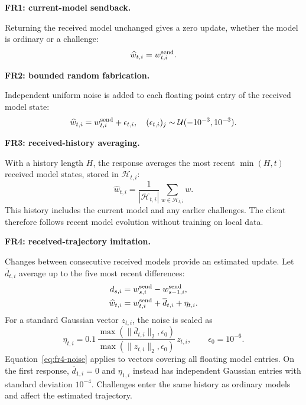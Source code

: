 \documentclass[journal]{IEEEtran}
\begin{document}
\par\medskip\noindent\textbf{FR1: current-model sendback.}\par\nopagebreak\smallskip\noindent
Returning the received model unchanged gives a zero update, whether the
model is ordinary or a challenge:
\begin{equation}
 \widehat w_{t,i}=w^{\rm send}_{t,i}.
\end{equation}

\par\medskip\noindent\textbf{FR2: bounded random fabrication.}\par\nopagebreak\smallskip\noindent
Independent uniform noise is added to each floating point entry of the
received model state:
\begin{equation}
 \widehat w_{t,i}=w^{\rm send}_{t,i}+\epsilon_{t,i},\quad
 (\epsilon_{t,i})_j\sim\mathcal U(-10^{-3},10^{-3}).
\end{equation}

\par\medskip\noindent\textbf{FR3: received-history averaging.}\par\nopagebreak\smallskip\noindent
With a history length $H$, the response averages the most recent
$\min(H,t)$ received model states, stored in $\mathcal H_{t,i}$:
\begin{equation}
 \widehat w_{t,i}=\frac{1}{|\mathcal H_{t,i}|}
       \sum_{w\in\mathcal H_{t,i}}w.
\end{equation}
This history includes the current model and any earlier challenges. The client
therefore follows recent model evolution without training on local data.

\par\medskip\noindent\textbf{FR4: received-trajectory imitation.}\par\nopagebreak\smallskip\noindent
Changes between consecutive received models provide an estimated update.
Let $\overline d_{t,i}$ average up to the five most recent differences:
\begin{align}
 d_{s,i}&=w^{\rm send}_{s,i}-w^{\rm send}_{s-1,i},\\
 \widehat w_{t,i}&=w^{\rm send}_{t,i}+\overline d_{t,i}+\eta_{t,i}.
\end{align}
For a standard Gaussian vector $z_{t,i}$, the noise is scaled as
\begin{equation}\label{eq:fr4-noise}
 \eta_{t,i}=0.1\,
 \frac{\max(\|\overline d_{t,i}\|_2,\epsilon_0)}
      {\max(\|z_{t,i}\|_2,\epsilon_0)}\,z_{t,i},
 \qquad\epsilon_0=10^{-6}.
\end{equation}
Equation~\eqref{eq:fr4-noise} applies to vectors covering all floating
model entries. On the first response,
$\overline d_{1,i}=0$ and $\eta_{1,i}$ instead has independent Gaussian entries with
standard deviation $10^{-4}$. Challenges enter the same history as ordinary
models and affect the estimated trajectory.
\end{document}
